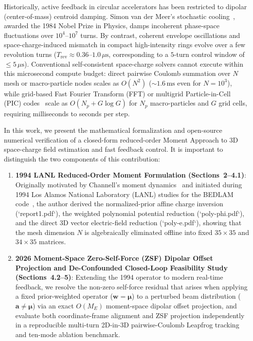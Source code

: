 \documentclass[11pt,a4paper]{article}
\begin{document}
Historically, active feedback in circular accelerators has been restricted to dipolar (center-of-mass) centroid damping. Simon van der Meer's stochastic cooling~\cite{vandermeer1972stochastic,vandermeer1985nobel}, awarded the 1984 Nobel Prize in Physics, damps incoherent phase-space fluctuations over $10^4\text{--}10^7$ turns. By contrast, coherent envelope oscillations and space-charge-induced mismatch in compact high-intensity rings evolve over a few revolution turns ($T_{\mathrm{rev}} \approx 0.36\text{--}1.0\,\mu\mathrm{s}$, corresponding to a $5$-turn control window of $\le 5\,\mu\mathrm{s}$). Conventional self-consistent space-charge solvers cannot execute within this microsecond compute budget: direct pairwise Coulomb summation over $N$ mesh or macro-particle nodes scales as $O(N^2)$ ($\sim 1.6\,\mathrm{ms}$ even for $N=10^3$), while grid-based Fast Fourier Transform (FFT) or multigrid Particle-in-Cell (PIC) codes~\cite{birdsall2018plasma,qiang2000three} scale as $O(N_p + G \log G)$ for $N_p$ macro-particles and $G$ grid cells, requiring milliseconds to seconds per step.

In this work, we present the mathematical formalization and open-source numerical verification of a closed-form reduced-order Moment Approach to 3D space-charge field estimation and fast feedback control. It is important to distinguish the two components of this contribution:
\begin{enumerate}
    \item \textbf{1994 LANL Reduced-Order Moment Formulation (Sections~2--4.1)}: Originally motivated by Channell's moment dynamics~\cite{channell1993moment} and initiated during 1994 Los Alamos National Laboratory (LANL) studies for the BEDLAM code~\cite{ahn1994preliminary}, the author derived the normalized-prior affine charge inversion (`report1.pdf`), the weighted polynomial potential reduction (`poly-phi.pdf`), and the direct 3D vector electric-field reduction (`poly-e.pdf`), showing that the mesh dimension $N$ is algebraically eliminated offline into fixed $35 \times 35$ and $34 \times 35$ matrices.
    \item \textbf{2026 Moment-Space Zero-Self-Force (ZSF) Dipolar Offset Projection and De-Confounded Closed-Loop Feasibility Study (Sections~4.2--5)}: Extending the 1994 operator to modern real-time feedback, we resolve the non-zero self-force residual that arises when applying a fixed prior-weighted operator ($\bm{w}=\bm{\mu}$) to a perturbed beam distribution ($\bm{a} \ne \bm{\mu}$) via an exact $O(M_E)$ moment-space dipolar offset projection, and evaluate both coordinate-frame alignment and ZSF projection independently in a reproducible multi-turn 2D-in-3D pairwise-Coulomb Leapfrog tracking and ten-mode ablation benchmark.
\end{enumerate}
\end{document}
